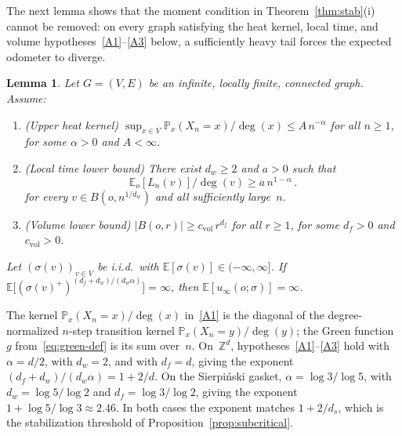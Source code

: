 \documentclass[11pt]{amsart}
\theoremstyle{plain}
\newtheorem{lemma}[theorem]{Lemma}
\theoremstyle{definition}
\newcommand{\Z}{\mathbb{Z}}
\newcommand{\E}{\mathbb{E}}
\renewcommand{\P}{\mathbb{P}}
\begin{document}
	The next lemma shows that the moment condition in Theorem~\ref{thm:stab}(i) cannot be removed: on every graph satisfying the heat kernel, local time, and volume hypotheses~\ref{A1}--\ref{A3} below, a sufficiently heavy tail forces the expected odometer to diverge.
	\begin{lemma}\label{lem:moment-sharpness}
		Let $G=(V,E)$ be an infinite, locally finite, connected graph.  Assume:
		\begin{enumerate}[label=\textup{(A\arabic*)}]
			\item\label{A1} \textup{(Upper heat kernel)}\; $\sup_{x\in V}\P_x(X_n=x)/\deg(x)\leq A\,n^{-\alpha}$ for all $n\geq 1$, for some $\alpha>0$ and $A<\infty$.
			\item\label{A2} \textup{(Local time lower bound)}\; There exist $d_w\geq 2$ and $a>0$ such that
			\[
			\E_o[L_n(v)]/\deg(v)\geq a\,n^{1-\alpha}\,.
			\]
			for every $v\in B(o,n^{1/d_w})$ and all sufficiently large~$n$.
			\item\label{A3} \textup{(Volume lower bound)}\; $|B(o,r)|\geq c_{\mathrm{vol}}\,r^{d_f}$ for all $r\geq 1$, for some $d_f>0$ and $c_{\mathrm{vol}}>0$.
		\end{enumerate}
		Let $(\sigma(v))_{v\in V}$ be i.i.d.\ with $\E[\sigma(v)]\in(-\infty,\infty]$.
		If $\E\bigl[(\sigma(v)^+)^{(d_f+d_w)/(d_w\alpha)}\bigr]=\infty$, then $\E[u_\infty(o;\sigma)]=\infty$.
	\end{lemma}
	
	The kernel $\P_x(X_n=x)/\deg(x)$ in~\ref{A1} is the diagonal of the degree-normalized $n$-step transition kernel $\P_x(X_n=y)/\deg(y)$; the Green function~$g$ from~\eqref{eq:green-def} is its sum over~$n$. On~$\Z^d$, hypotheses~\ref{A1}--\ref{A3} hold with $\alpha=d/2$, with $d_w=2$, and with $d_f=d$, giving the exponent $(d_f+d_w)/(d_w\alpha)=1+2/d$. On the Sierpi\'nski gasket, $\alpha=\log 3/\log 5$, with $d_w=\log 5/\log 2$ and $d_f=\log 3/\log 2$, giving the exponent $1+\log 5/\log 3\approx 2.46$. In both cases the exponent matches $1+2/d_s$, which is the stabilization threshold of Proposition~\ref{prop:subcritical}.
	
\end{document}
